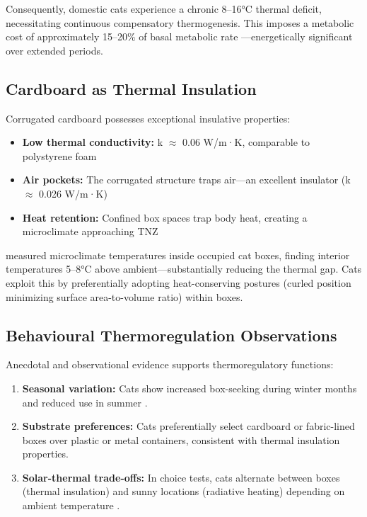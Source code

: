 \documentclass[12pt,a4paper]{article}
\begin{document}
Consequently, domestic cats experience a chronic 8–16°C thermal deficit, necessitating continuous compensatory thermogenesis. This imposes a metabolic cost of approximately 15–20\% of basal metabolic rate \citep{NRC2006}—energetically significant over extended periods.

\subsection{Cardboard as Thermal Insulation}

Corrugated cardboard possesses exceptional insulative properties:

\begin{itemize}
    \item \textbf{Low thermal conductivity:} k $\approx$ 0.06 W/m·K, comparable to polystyrene foam
    \item \textbf{Air pockets:} The corrugated structure traps air—an excellent insulator (k $\approx$ 0.026 W/m·K)
    \item \textbf{Heat retention:} Confined box spaces trap body heat, creating a microclimate approaching TNZ
\end{itemize}

\citet{koizumi1992} measured microclimate temperatures inside occupied cat boxes, finding interior temperatures 5–8°C above ambient—substantially reducing the thermal gap. Cats exploit this by preferentially adopting heat-conserving postures (curled position minimizing surface area-to-volume ratio) within boxes.

\subsection{Behavioural Thermoregulation Observations}

Anecdotal and observational evidence supports thermoregulatory functions:

\begin{enumerate}
    \item \textbf{Seasonal variation:} Cats show increased box-seeking during winter months and reduced use in summer \citep{turner2000}.
    
    \item \textbf{Substrate preferences:} Cats preferentially select cardboard or fabric-lined boxes over plastic or metal containers, consistent with thermal insulation properties.
    
    \item \textbf{Solar-thermal trade-offs:} In choice tests, cats alternate between boxes (thermal insulation) and sunny locations (radiative heating) depending on ambient temperature \citep{piccione2013}.
\end{enumerate}
\end{document}
